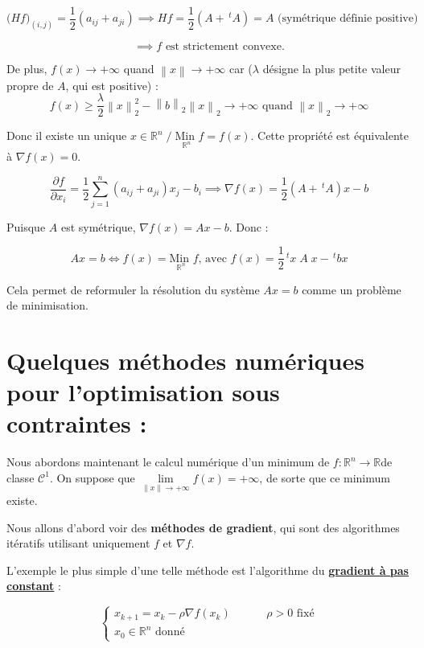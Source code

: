 \documentclass[a4paper,11pt]{article}
\newcommand{\R}{\mathbb{R}}
\newcommand{\norm}[1]{\left\lVert#1\right\rVert}
\newcommand{\tpo}[1]{\,^t#1}
\newcommand{\derpart}[2]{\displaystyle\frac{\partial#1}{\partial #2}}
\newcommand{\deffonc}[3]{#1 : #2 \longrightarrow #3}
\newcommand{\Co}{\mathcal{C}}
\newcommand{\MinI}[1]{\underset{#1}{\text{Min }}}
\theoremstyle{plain} %
\begin{document}
\[
    \Big( Hf \Big)_{(i,j)} = \frac{1}{2}(a_{ij} + a_{ji}) \implies
    Hf = \frac{1}{2}(A + \tpo{A}) = A \text{ (symétrique définie positive)}
\]

\[
    \implies f \text{ est strictement convexe.}
\]

De plus, $f(x) \longrightarrow +\infty$ quand $\norm{x} \longrightarrow +\infty$ car ($\lambda$ désigne
la plus petite valeur propre de $A$, qui est positive) :
\[
    f(x) \geq \frac{\lambda}{2} \norm{x}^2_2 - \norm{b}_2 \norm{x}_2 \longrightarrow +\infty \text{ quand } \norm{x}_2 \longrightarrow +\infty
\]

Donc il existe un unique $x \in \R^n \; / \; \MinI{\R^n} f = f(x)$.
Cette propriété est équivalente à $\nabla f(x) = 0$. 

\[
    \derpart{f}{x_i} = \frac{1}{2} \sum_{j=1}^n (a_{ij} + a_{ji})x_j - b_i
    \implies \nabla f(x) = \frac{1}{2}(A + \tpo{A})x - b
\]

Puisque $A$ est symétrique, $\nabla f(x) = Ax - b$. Donc :

\[
    Ax = b \iff f(x) = \MinI{\R^n} f \text{, avec } f(x) = \frac{1}{2}\tpo{x} \; A \; x - \tpo{b} x
\]

Cela permet de reformuler la résolution du système $Ax = b$ comme un problème
de minimisation.

\section{Quelques méthodes numériques pour l'optimisation sous contraintes :}

Nous abordons maintenant le calcul numérique d'un minimum de $\deffonc{f}{\R^n}{\R}$de classe $\Co^1$. On suppose que $\underset{\norm{x} \longrightarrow +\infty}{\lim} f(x) = +\infty$, de sorte que ce minimum existe.

Nous allons d'abord voir des \textbf{méthodes de gradient}, qui sont des
algorithmes itératifs utilisant uniquement $f$ et $\nabla f$.

L'exemple le plus simple d'une telle méthode est l'algorithme du
\underline{\textbf{gradient à pas constant}} :

\[
    \left\lbrace
    \begin{array}{cc}
        x_{k+1} = x_k - \rho \nabla f(x_k) & \hspace{1cm} \rho > 0 \text{ fixé} \\ [5pt]
        x_0 \in \R^n \text{ donné}
    \end{array}
    \right.
\]
\end{document}
